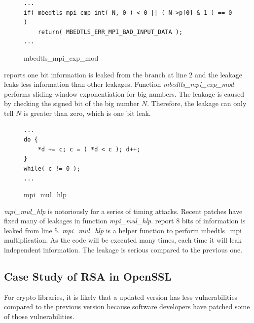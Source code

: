 \begin{figure}[h!]
    \centering
\begin{lstlisting}[xleftmargin=.02\textwidth,xrightmargin=.01\textwidth]
...
if( mbedtls_mpi_cmp_int( N, 0 ) < 0 || ( N->p[0] & 1 ) == 0 )
    return( MBEDTLS_ERR_MPI_BAD_INPUT_DATA );
...
\end{lstlisting}
\caption{mbedtls\_mpi\_exp\_mod}
\label{mbedtls_rsa_1}
\end{figure}

\tool{} reports one bit information is leaked from the branch at line 2 and
the leakage leaks less information than other leakages.
Function \emph{mbedtls\_mpi\_exp\_mod} performs sliding-window exponentiation for
big numbers. 
The leakage is caused by checking the signed bit of the big number $N$. 
Therefore, the leakage can only tell $N$ is greater than zero, which is one
bit leak.


\begin{figure}[h!]
    \centering
\begin{lstlisting}[xleftmargin=.02\textwidth,xrightmargin=.01\textwidth]
...
do {
    *d += c; c = ( *d < c ); d++;
}
while( c != 0 );
...
\end{lstlisting}
\caption{mpi\_mul\_hlp}
\label{mbedtls_rsa_2}
\end{figure}

\emph{mpi\_mul\_hlp} is notoriously for a series of timing attacks. Recent 
patches have fixed many of leakages in function \emph{mpi\_mul\_hlp}.
\tool{} report 8 bits of information is leaked from line 5. 
\emph{mpi\_mul\_hlp} is a helper function to perform
mbedtls\_mpi multiplication. As the code will be executed many times,
each time it will leak independent information. The leakage is serious 
compared to the previous one.

\subsection{Case Study of RSA in OpenSSL}
For crypto libraries, it is likely that a updated version has less vulnerabilities
compared to the previous version because software developers have patched some
of those vulnerabilities.  

